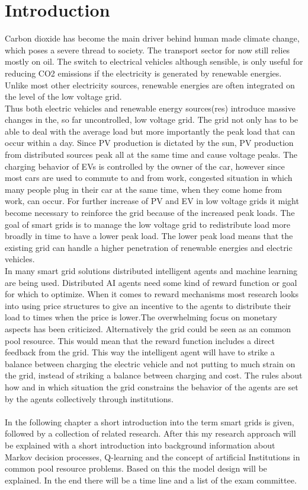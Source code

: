 \documentclass[a4paper]{article}
\begin{document}
\section{Introduction}
Carbon dioxide has become the main driver behind human made climate change, which poses a severe thread to society. The transport sector for now still relies mostly on oil. The switch to electrical vehicles although sensible, is only useful for reducing CO2 emissions if the electricity is generated by renewable energies. Unlike most other electricity sources, renewable energies are often integrated on the level of the low voltage grid.\\
Thus both electric vehicles and renewable energy sources(res) introduce massive changes in the, so far uncontrolled, low voltage grid. The grid not only has to be able to deal with the average load but more importantly the peak load that can occur within a day. Since PV production is dictated by the sun, PV production from distributed sources peak all at the same time and cause voltage peaks. The charging behavior of EVs is controlled by the owner of the car, however since most cars are used to commute to and from work, congested situation in which many people plug in their car at the same time, when they come home from work, can occur. For further increase of PV and EV in low voltage grids it might become necessary to reinforce the grid because of the increased peak loads.
The goal of smart grids is to manage the low voltage grid to redistribute load more broadly in time to have a lower peak load. The lower peak load means that the existing grid can handle a higher penetration of renewable energies and electric vehicles.  \\
In many smart grid solutions distributed intelligent agents and machine learning are being used. Distributed AI agents need some kind of reward function or goal for which to optimize. When it comes to reward mechanisms most research looks into using price structures to give an incentive to the agents to distribute their load to times when the price is lower.The overwhelming focus on monetary aspects has been criticized. Alternatively the grid could be seen as an common pool resource. This would mean that the reward function includes a direct feedback from the grid. This way the intelligent agent will have to strike a balance between charging the electric vehicle and not putting to much strain on the grid, instead of striking a balance between charging and cost. The rules about how and in which situation the grid constrains the behavior of the agents are set by the agents collectively through institutions. 
\\ \\
In the following chapter a short introduction into the term smart grids is given, followed by a collection of related research. After this my research approach will be explained with a short introduction into background information about Markov decision processes, Q-learning and the concept of artificial Institutions in common pool resource problems. Based on this the model design will be explained. 
In the end there will be a time line and a list of the exam committee. 
\end{document}
